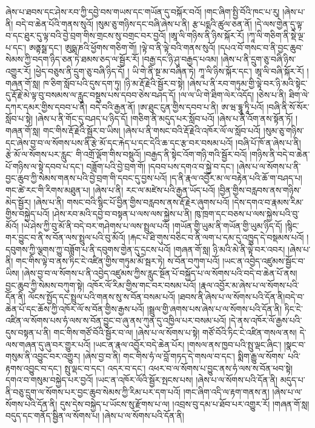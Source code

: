 ཞེས་པ་ཐབས་དང་ཤེས་རབ་ཀྱི་དབྱེ་བས་གཡས་དང་གཡོན་དུ་བསྐོར་བའོ། །གང་ཞིག་སྤྱི་བོའི་ཁང་པ་རུ། །ཞེས་པ་ནི། བདེ་བ་ཆེན་པོའི་གནས་སུའོ། །སུམ་ཅུ་གཉིས་དང་བཞི་ཞེས་པ་ནི། རྩ་པདྨའི་ཚུལ་ཅན་ནོ། །དེ་ལས་གྱེན་དུ་ལྟ་བ་དང་ཐུར་དུ་ལྟ་བའི་བྱེ་བྲག་གིས་གྲངས་སུ་བགྲང་བར་བྱའོ། །ཨཱ་ལི་གཉིས་ནི་ཉིས་སྐོར་རོ། །ཀཱ་ལི་གཅིག་ནི་སྡེ་ལྔ་པ་དང་། ཨནྟསྠ་དང་། ཨུཥྨ་ཎའི་ཕྱོགས་གཅིག་གོ། །ལྟེ་བ་ནི་ལྟེ་བའི་གནས་སུའོ། །དཔའ་བོ་གསང་བ་ནི་བྱང་ཆུབ་སེམས་ཀྱི་བདག་ཉིད་ཅན་ཏེ་ཐམས་ཅད་ལ་སྦྱོར་རོ། །བརྒྱ་དང་ཉི་ཤུ་བརྒྱད་པའམ། །ཞེས་པ་ནི་དྲུག་ཅུ་བཞི་ཉིས་འགྱུར་རོ། །ཕྱེད་བཅུས་ནི་དྲུག་ཅུ་བཞི་ཉིད་དོ། །
ཡི་གེ་ནི་སྔ་མ་བཞིན་ཏེ། ཀཱ་ལི་ཉིས་སྐོར་དང་། ཨཱ་ལི་བཞི་སྐོར་རོ། །གཞན་གོ་སླ། ཁ་ཅིག་སློབ་པའི་དུས་དག་ཏུ། །ཉི་མ་རྡོ་རྗེའི་སྦྱོར་བ་སྟེ། །ཞེས་པ་ནི་རབ་གཏུམ་གྱི་ལྟེ་བར་ཉི་མའི་སྟེང་དུ་རྡོ་རྗེ་མེ་ལྟ་བུ་བསམས་ལ་རླུང་བསྡུས་པས་དབབ་ཅེས་བཤད་དོ། །ལ་ལ་ཡི་གེ་ཐིག་ལེར་འདོད། །ཅེས་པ་ནི། ཐིག་ལེ་དཀར་དམར་གྱིས་དབབ་པ་ནི། བདེ་བའི་རྒྱན་ནོ། །ཨ་ཐུང་ངུན་གྱིས་དབབ་པ་ནི། ཨ་ཝ་དྷཱུ་ཏཱི་པའོ། །བཞི་ནི་སོ་སོར་སློབ་པ་སྟེ། །ཞེས་པ་ནི་གོང་དུ་བཤད་པ་ཉིད་དོ། །གཅིག་ནི་མདུད་པར་སློབ་པའོ། །ཞེས་པ་ནི་འོག་ནས་སྟོན་ཏོ། །གཞན་གོ་སླ། གང་གིས་རྡོ་རྗེའི་སྦྱོར་བ་ཡིས། །ཞེས་པ་ནི་གསང་བའི་རྡོ་རྗེའི་འཁོར་ལོ་ལ་སློབ་པའོ། །སུམ་ཅུ་གཉིས་དང་ཞེས་བྱ་བ་ལ་སོགས་པས་ནི་རྩེ་མོ་དང་རྐེད་པ་དང་དེའི་ཆ་དང་རྩ་བར་བསམ་པའོ། །བཞི་པོ་ཁོ་ན་ཞེས་པ་ནི། རྩེ་མོ་ལ་སོགས་པར་རླུང་​ གི་འགྲོ་ལྡོག་གིས་བསྡུའོ། །བརྒྱད་ནི་སྟེང་འོག་གཉི་གའི་སྦྱོར་བའོ། །གཉིས་ནི་བདེ་བ་ཆེན་པོ་གཉིས་ལ་སྟེ་དབབ་པ་དང་། བཟློག་པའི་བྱེ་བྲག་གོ། །དབབ་པས་དགའ་བ་སྐྱེ་བ་དང་། །ཞེས་པ་ལ་སོགས་པ་ནི་བྱང་ཆུབ་ཀྱི་སེམས་གནས་པའི་བྱེ་བྲག་གི་དབང་དུ་བྱས་པའོ། །ད་ནི་རྣལ་འབྱོར་མ་ལ་བརྟེན་པའི་ཆོ་ག་བཤད་པ། གང་ཚེ་རང་གི་རིགས་མཐུན་པ། །ཞེས་པ་ནི། རང་ལ་མཛེས་པའི་རྒྱན་ཡོད་པའོ། །བྱིན་གྱིས་བརླབས་ནས་གཉིས་མེད་སྦྱོར། །ཞེས་པ་ནི། གསང་བའི་སྙིང་པོ་བྱིན་གྱིས་བརླབས་ནས་རྡོ་རྗེར་ཞུགས་པའོ། །དེས་དགའ་བ་རྣམས་རིམ་གྱིས་བསྐྱེད་པའོ། །ཤེས་རབ་མའི་དབྱེ་བ་བསྟན་པ་ལས་ལས་སྐྱེས་པ་ནི། ཁུ་ཁྲག་དང་བཅས་པ་ལས་སྐྱེས་པའི་བུ་མོའོ། །ཡེ་ཤེས་ཀྱི་བུ་མོ་ནི་བདེ་བར་གཤེགས་པ་ལས་སྤྲུལ་པའོ། །གཡོན་གྱི་ཡུམ་ནི་གཡོན་གྱི་ཡུམ་ཉིད་དོ། །སྙིང་གར་བྱུང་བ་ནི་ས་བོན་ལས་སྤྲུལ་པའི་བུ་མོའོ། །རྐང་པ་ཐི་གུས་བཅིང་བ་ནི་ལག་པ་དམ་དུ་འཁྱུད་དེ་བསྡམས་པའོ། །དབུགས་ཀྱི་ལྕགས་ཀྱུ་བཟློག་པ་ནི་དབུགས་གྱེན་དུ་དྲངས་པའོ། །གཞན་གོ་སླ། ཉི་མའི་མེ་ནི་ལྟེ་བར་འབར། །ཞེས་པ་ནི། གང་གིས་ལྟེ་བ་ནས་ཏིང་ངེ་འཛིན་གྱིས་གཏུམ་མོ་སྦར་ཏེ། ས་བོན་བཀུག་པའོ། །ཡང་ན་འབྱེད་འཛུམས་སྦྱོང་བ་ཡིས། །ཞེས་བྱ་བ་ལ་སོགས་པ་ནི་འབྱེད་འཛུམས་ཀྱིས་རླུང་སྔོན་པོ་བསྐྱོད་པ་ལ་སོགས་པའི་བདེ་བ་ཆེན་པོ་ནས། བྱང་ཆུབ་ཀྱི་སེམས་བཀུག་སྟེ། འཁོར་ལོ་རིམ་གྱིས་གང་བར་བསམ་པའོ། །རྣལ་འབྱོར་མ་ཞེས་པ་ལ་སོགས་པའི་དོན་ནི། ལོངས་སྤྱོད་དང་སྤྲུལ་པའི་གནས་སུ་ས་བོན་བསམ་པའོ། །ཐབས་ནི་ཞེས་པ་ལ་སོགས་པའི་དོན་ནི།བདེ་བ་ཆེན་པོ་དང་ཆོས་ཀྱི་འཁོར་ལོ་ས་བོན་གྱིས་རྒྱས་པའོ། །སྦྲུལ་གྱི་ཞགས་པས་ཞེས་པ་ལ་སོགས་པའི་དོན་ནི། ཏིང་ངེ་འཛིན་ལ་སོགས་པས་ཧཾ་ལས་ས་བོན་བྱུང་བ་ཞུ་ནས་ཀུན་དུ་འཁྱིལ་པར་བསམ་པའོ། །དེ་ནས་འཁོར་ལོ་རྒྱས་པའི་དུས་བསྟན་པ་ནི། གང་གིས་གཙོ་བོའི་སྦྱོར་བ་ལ། །ཞེས་པ་ལ་སོགས་པ་སྟེ། གཙོ་བོའི་ཏིང་ངེ་འཛིན་གསལ་ནས། དེ་ལས་གཞན་དུ་ཞུ་བར་གྱུར་པའོ། །ཡང་ན་རྣལ་འབྱོར་བདེ་ཆེན་པོར། །གསལ་ནས་ཁྱབ་པའི་སྤུ་ལྡང་ཞིང་། །སྣང་བ་གསུམ་ནི་འབྱུང་བར་འགྱུར། །ཞེས་བྱ་བ་ནི། གང་གིས་ཧཾ་ལ་བློ་གཏད་དེ་གསལ་བ་དང་། སྨིག་རྒྱུ་ལ་སོགས་​ པའི་རྟགས་འབྱུང་བ་དང་། སྤུ་ལྡང་བ་དང་། འདར་བ་དང་། འཕར་བ་ལ་སོགས་པ་བྱུང་ནས་ཧཾ་ལས་ས་བོན་ཕབ་སྟེ། དགའ་བ་གསུམ་བསྐྱེད་པར་བྱའོ། །ཡང་ན་འཁོར་ལོའི་སྦྱོར་སྤངས་པས། །ཞེས་པ་ལ་སོགས་པའི་དོན་ནི། མདུད་པ་ནི་བཅུ་དྲུག་ལ་སོགས་པར་བྱང་ཆུབ་སེམས་ཀྱི་རིམ་པར་དག་པའོ། །གང་ཞིག་འདི་ལ་རྟག་གནས་ན། །ཞེས་པ་ལ་སོགས་པའི་དོན་ནི། དུས་དེས་བསྐྱེད་པ་ཡོངས་སུ་རྫོགས་པ་ལ། །འབྲས་བུ་དམ་པ་ཐོབ་པར་འགྱུར་རོ། །གཞན་གོ་སླ། བདུད་དང་གནོད་སྦྱིན་ལ་སོགས་པ། །ཞེས་པ་ལ་སོགས་པའི་དོན་ནི། 